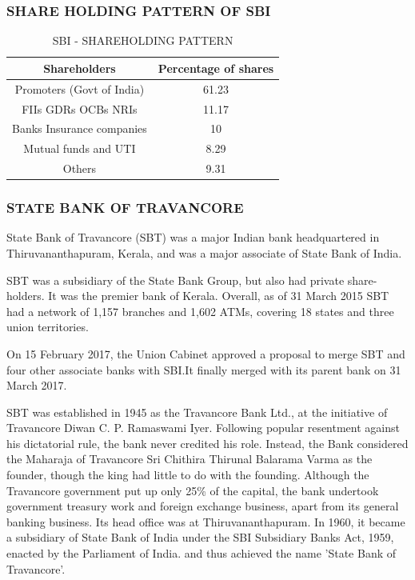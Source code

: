 \documentclass[a4paper, 12pt]{extarticle}
\begin{document}
{\subsubsection{SHARE HOLDING PATTERN OF SBI}
\begin{table}[H]
\centering
\begin{tabular}{|c|c|}
\hline
Shareholders & Percentage of shares \\
\hline
Promoters (Govt of India) & 61.23 \\
\hline
FIIs GDRs OCBs NRIs & 11.17 \\
\hline
Banks Insurance companies & 10\\
\hline
Mutual funds and UTI & 8.29\\
\hline
Others & 9.31 \\
\hline
\end{tabular}
\caption{SBI - SHAREHOLDING PATTERN}
\end{table}

\subsubsection{STATE BANK OF TRAVANCORE}
State Bank of Travancore (SBT) was a major Indian bank headquartered in Thiruvananthapuram, Kerala, and was a major associate of State Bank of India.

SBT was a subsidiary of the State Bank Group, but also had private share-holders. It was the premier bank of Kerala. Overall, as of 31 March 2015 SBT had a network of 1,157 branches and 1,602 ATMs, covering 18 states and three union territories.

On 15 February 2017, the Union Cabinet approved a proposal to merge SBT and four other associate banks with SBI.It finally merged with its parent bank on 31 March 2017. 

SBT was established in 1945 as the Travancore Bank Ltd., at the initiative of Travancore Diwan C. P. Ramaswami Iyer. Following popular resentment against his dictatorial rule, the bank never credited his role. Instead, the Bank considered the Maharaja of Travancore Sri Chithira Thirunal Balarama Varma as the founder, though the king had little to do with the founding. Although the Travancore government put up only 25\% of the capital, the bank undertook government treasury work and foreign exchange business, apart from its general banking business. Its head office was at Thiruvananthapuram. In 1960, it became a subsidiary of State Bank of India under the SBI Subsidiary Banks Act, 1959, enacted by the Parliament of India. and thus achieved the name 'State Bank of Travancore'.

}
\end{document}
